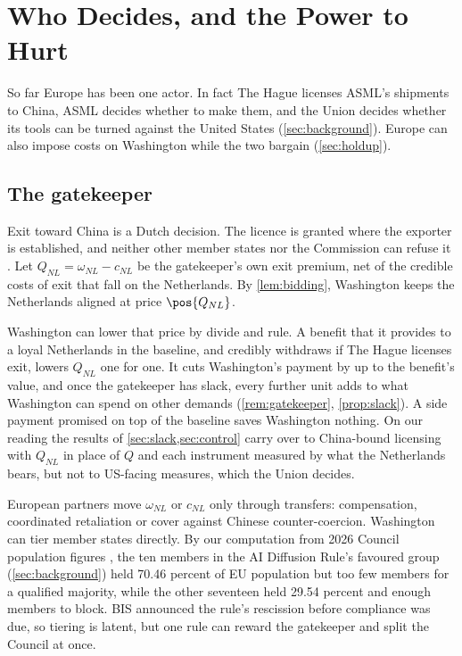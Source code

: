\section{Who Decides, and the Power to Hurt}\label{sec:decide}

So far Europe has been one actor. In fact The Hague licenses ASML's shipments to China, ASML decides whether to make them, and the Union decides whether its tools can be turned against the United States (\cref{sec:background}). Europe can also impose costs on Washington while the two bargain (\cref{sec:holdup}).

\subsection{The gatekeeper}\label{sec:gatekeeper}

Exit toward China is a Dutch decision. The licence is granted where the exporter is established, and neither other member states nor the Commission can refuse it \citep{eu2021dualuse}. Let $Q_{NL}=\omega_{NL}-c_{NL}$ be the gatekeeper's own exit premium, net of the credible costs of exit that fall on the Netherlands. By \cref{lem:bidding}, Washington keeps the Netherlands aligned at price $\pos{Q_{NL}}$.

Washington can lower that price by divide and rule. A benefit that it provides to a loyal Netherlands in the baseline, and credibly withdraws if The Hague licenses exit, lowers $Q_{NL}$ one for one. It cuts Washington's payment by up to the benefit's value, and once the gatekeeper has slack, every further unit adds to what Washington can spend on other demands (\cref{rem:gatekeeper}, \cref{prop:slack}). A side payment promised on top of the baseline saves Washington nothing. On our reading the results of \cref{sec:slack,sec:control} carry over to China-bound licensing with $Q_{NL}$ in place of $Q$ and each instrument measured by what the Netherlands bears, but not to US-facing measures, which the Union decides.

European partners move $\omega_{NL}$ or $c_{NL}$ only through transfers: compensation, coordinated retaliation or cover against Chinese counter-coercion. Washington can tier member states directly. By our computation from 2026 Council population figures \citep{council2025population}, the ten members in the AI Diffusion Rule's favoured group (\cref{sec:background}) held 70.46 percent of EU population but too few members for a qualified majority, while the other seventeen held 29.54 percent and enough members to block. BIS announced the rule's rescission before compliance was due, so tiering is latent, but one rule can reward the gatekeeper and split the Council at once.

